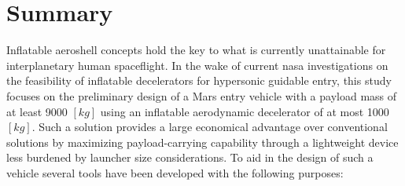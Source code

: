 \section*{Summary}\label{cha:summary}
Inflatable aeroshell concepts hold the key to what is currently unattainable for interplanetary human spaceflight. In the wake of current \acrshort{nasa} investigations on the feasibility of inflatable decelerators for hypersonic guidable entry, this study focuses on the preliminary design of a Mars entry vehicle with a payload mass of at least 9000 $\left[kg\right]$ using an inflatable aerodynamic decelerator of at most 1000 $\left[kg\right]$. Such a solution provides a large economical advantage over conventional solutions by maximizing payload-carrying capability through a lightweight device less burdened by launcher size considerations.
\newline
\newline
To aid in the design of such a vehicle several tools have been developed with the following purposes:

